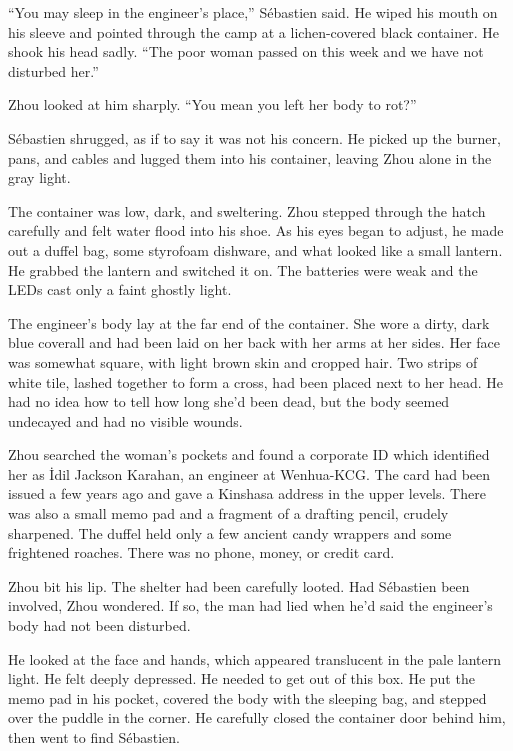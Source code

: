 \documentclass[10pt,a4paper]{article}
\begin{document}
``You may sleep in the engineer's place,'' S\'{e}bastien said. He wiped his
mouth on his sleeve and pointed through the camp at a lichen-covered
black container. He shook his head sadly.  ``The poor woman passed
on this week and we have not disturbed her.''

Zhou looked at him sharply. ``You mean you left her body to rot?''

S\'{e}bastien shrugged, as if to say it was not his concern. He picked
up the burner, pans, and cables and lugged them into his container,
leaving Zhou alone in the gray light.

\bigskip

The container was low, dark, and sweltering. Zhou stepped through
the hatch carefully and felt water flood into his shoe. As his eyes
began to adjust, he made out a duffel bag, some styrofoam dishware,
and what looked like a small lantern. He grabbed the lantern and
switched it on. The batteries were weak and the LEDs cast only a
faint ghostly light.

The engineer's body lay at the far end of the container. She wore
a dirty, dark blue coverall and had been laid on her back with her
arms at her sides. Her face was somewhat square, with light brown
skin and cropped hair. Two strips of white tile, lashed together
to form a cross, had been placed next to her head. He had no idea
how to tell how long she'd been dead, but the body seemed undecayed
and had no visible wounds.

Zhou searched the woman's pockets and found a corporate ID
which identified her as \.{I}dil Jackson Karahan, an engineer at
Wenhua-KCG. The card had been issued a few years ago and gave
a Kinshasa address in the upper levels. There was also a small
memo pad and a fragment of a drafting pencil, crudely sharpened.
The duffel held only a few ancient candy wrappers and some frightened
roaches. There was no phone, money, or credit card.

Zhou bit his lip. The shelter had been carefully looted. Had
S\'{e}bastien been involved, Zhou wondered. If so, the man had lied
when he'd said the engineer's body had not been disturbed.

He looked at the face and hands, which appeared translucent in
the pale lantern light. He felt deeply depressed. He needed to
get out of this box. He put the memo pad in his pocket, covered
the body with the sleeping bag, and stepped over the puddle in
the corner. He carefully closed the container door behind him,
then went to find S\'{e}bastien.
\end{document}
